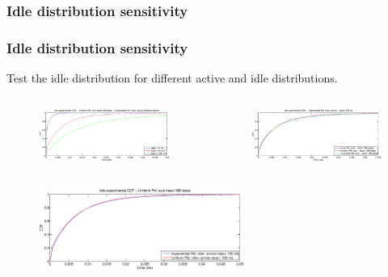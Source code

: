 \documentclass[9pt,handout,serif]{beamer}
\begin{document}
\subsubsection*{Idle distribution sensitivity}
\begin{frame}[c]
	\frametitle{Idle distribution sensitivity}
	Test the idle distribution for different active and idle distributions.
	\begin{center}
	\begin{columns}
		\centering
			\begin{figure}
				\centering
				\includegraphics[width=1.1\textwidth]{../images/results/GlobalView/cdf_exponential}
			\end{figure}
			\begin{figure}
				\centering
				\includegraphics[width=1.1\textwidth]{../images/results/GlobalView/cdf_pkt_sizes}
			\end{figure}
	\end{columns}
	\end{center}
	\begin{figure}
		\includegraphics[width=0.6\textwidth]{../images/results/GlobalView/cdf_idle_same_mean}
	\end{figure}
\end{frame}
\end{document}
